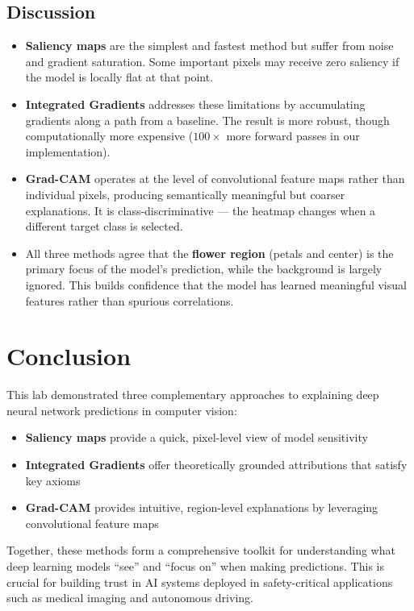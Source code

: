 \documentclass[12pt,a4paper]{article}
\begin{document}
\subsection{Discussion}
\begin{itemize}
    \item \textbf{Saliency maps} are the simplest and fastest method but suffer from noise and gradient saturation. Some important pixels may receive zero saliency if the model is locally flat at that point.
    
    \item \textbf{Integrated Gradients} addresses these limitations by accumulating gradients along a path from a baseline. The result is more robust, though computationally more expensive ($100\times$ more forward passes in our implementation).
    
    \item \textbf{Grad-CAM} operates at the level of convolutional feature maps rather than individual pixels, producing semantically meaningful but coarser explanations. It is class-discriminative --- the heatmap changes when a different target class is selected.
    
    \item All three methods agree that the \textbf{flower region} (petals and center) is the primary focus of the model's prediction, while the background is largely ignored. This builds confidence that the model has learned meaningful visual features rather than spurious correlations.
\end{itemize}

\section{Conclusion}
This lab demonstrated three complementary approaches to explaining deep neural network predictions in computer vision:
\begin{itemize}
    \item \textbf{Saliency maps} provide a quick, pixel-level view of model sensitivity
    \item \textbf{Integrated Gradients} offer theoretically grounded attributions that satisfy key axioms
    \item \textbf{Grad-CAM} provides intuitive, region-level explanations by leveraging convolutional feature maps
\end{itemize}

Together, these methods form a comprehensive toolkit for understanding what deep learning models ``see'' and ``focus on'' when making predictions. This is crucial for building trust in AI systems deployed in safety-critical applications such as medical imaging and autonomous driving.
\end{document}
